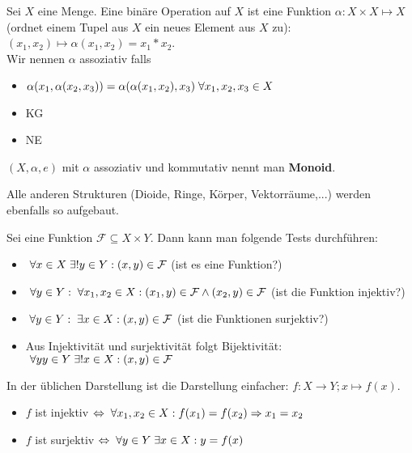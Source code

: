 \documentclass[main.tex]{subfiles}
\begin{document}
\begin{Beispiel}
  Sei $X$ eine Menge. Eine binäre Operation auf $X$ ist eine Funktion $\alpha: X \times X \mapsto X$ (ordnet einem Tupel aus $X$ ein neues Element aus $X$ zu): $(x_1,x_2)\mapsto \alpha(x_1,x_2) = x_1 * x_2$.\\
  Wir nennen $\alpha$ assoziativ falls
  \begin{itemize}
    \item $\alpha(x_1,\alpha(x_2,x_3)) = \alpha(\alpha(x_1,x_2),x_3) \;\forall x_1,x_2,x_3 \in X$
    \item KG
    \item NE
  \end{itemize}
  $(X,\alpha,e)$ mit $\alpha$ assoziativ und kommutativ nennt man \textbf{Monoid}.
  \begin{Bemerkung}
    Alle anderen Strukturen (Dioide, Ringe, Körper, Vektorräume,...) werden ebenfalls so aufgebaut.
  \end{Bemerkung}
\end{Beispiel}

\begin{Definition}[Funktion]
  Sei eine Funktion $\mathcal{F} \subseteq X \times Y$. Dann kann man folgende Tests durchführen:
  \begin{itemize}
    \item $\;\forall x\in X \;\exists! y\in Y :(x,y)\in \mathcal{F}$ (ist es eine Funktion?)
    \item $\;\forall y\in Y : \;\forall x_1,x_2 \in X :(x_1,y)\in \mathcal{F} \land (x_2,y)\in \mathcal{F}$ (ist die Funktion injektiv?)
    \item $\;\forall y \in Y : \;\exists x\in X : (x,y)\in \mathcal{F}$ (ist die Funktionen surjektiv?)
    \item Aus Injektivität und surjektivität folgt Bijektivität: $\;\forall y y \in Y \;\exists ! x\in X : (x,y) \in \mathcal{F}$
  \end{itemize}

  In der üblichen Darstellung ist die Darstellung einfacher: $f:X\to Y; x\mapsto f(x)$.

  \begin{itemize}
    \item $f$ ist injektiv $\Leftrightarrow \;\forall x_1,x_2 \in X : f(x_1)  = f(x_2) \Rightarrow x_1 = x_2$
    \item $f$ ist surjektiv $\Leftrightarrow \;\forall y \in Y \;\exists x\in X : y=f(x)$
  \end{itemize}
\end{Definition}
\end{document}
